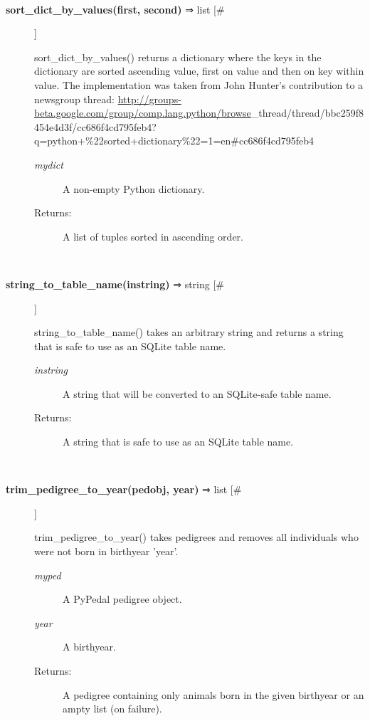 \documentclass[10pt]{article}
\begin{document}
\begin{description}
\begin{description}
\end{description}
\\ 

\item[\textbf{sort\_dict\_by\_values(first, second)}
 ⇒ list [\#]]

 sort\_dict\_by\_values() returns a dictionary where the keys in the dictionary are sorted ascending value, first on value and then on key within value. The implementation was taken from John Hunter's contribution to a newsgroup thread: \url{http://groups-beta.google.com/group/comp.lang.python/browse}\_thread/thread/bbc259f8454e4d3f/cc686f4cd795feb4?q=python+\%22sorted+dictionary\%22=1=en\#cc686f4cd795feb4 
\begin{description}
\item[\emph{mydict}
] A non-empty Python dictionary.
\item[Returns:] A list of tuples sorted in ascending order.

\end{description}
\\ 

\item[\textbf{string\_to\_table\_name(instring)}
 ⇒ string [\#]]

 string\_to\_table\_name() takes an arbitrary string and returns a string that is safe to use as an SQLite table name.
\begin{description}
\item[\emph{instring}
] A string that will be converted to an SQLite-safe table name.
\item[Returns:] A string that is safe to use as an SQLite table name.

\end{description}
\\ 

\item[\textbf{trim\_pedigree\_to\_year(pedobj, year)}
 ⇒ list [\#]]

 trim\_pedigree\_to\_year() takes pedigrees and removes all individuals who were not born in birthyear 'year'.
\begin{description}
\item[\emph{myped}
] A PyPedal pedigree object.
\item[\emph{year}
] A birthyear.
\item[Returns:] A pedigree containing only animals born in the given birthyear or an ampty list (on failure).

\end{description}
\\ 


\end{description}
\end{document}
